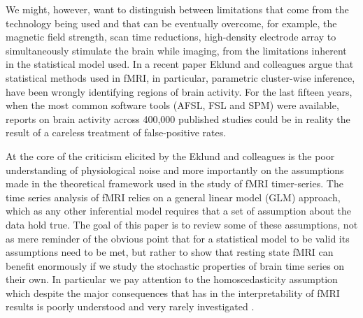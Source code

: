 \documentclass[10pt,letterpaper]{article}
\begin{document}

 
We might, however, want to distinguish between limitations that come from the technology being used and that can be eventually overcome, for example, the magnetic field strength, scan time reductions, high-density electrode array to simultaneously stimulate the brain while imaging, from the limitations inherent in the statistical model used. In a recent paper Eklund and colleagues \cite{eklund2016cluster} argue that statistical methods used in fMRI, in particular, parametric cluster-wise inference, have been wrongly identifying regions of brain activity. For the last fifteen years, when the most common software tools (AFSL, FSL and SPM) were available, reports on brain activity across 400,000 published studies could be in reality the result of a careless treatment of false-positive rates. 

At the core of the criticism elicited by the Eklund and colleagues is the poor understanding of physiological noise and more importantly on the assumptions made in the theoretical framework used in the study of fMRI timer-series. The time series analysis of fMRI relies on a general linear model (GLM) approach, which as any other inferential model requires that a set of assumption about the data hold true. 
The goal of this paper is to review some of these assumptions, not as mere reminder of the obvious point that for a statistical model to be valid its assumptions need to be met, but rather to show that resting state fMRI can benefit enormously if we study the stochastic properties of brain time series on their own. In particular we pay attention to the homoscedasticity assumption which despite the major consequences that has in the interpretability of fMRI results is poorly understood and very rarely investigated \citep{lindquist2014evaluating}. 
\end{document}
